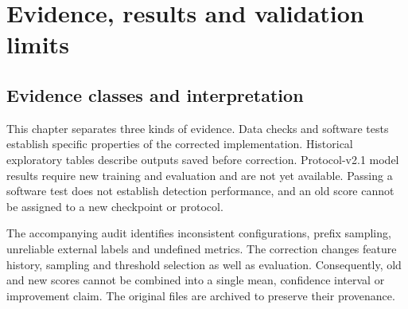 \documentclass[12pt,a4paper,oneside,openany]{extbook}
\begin{document}

\chapter{Evidence, results and validation limits}\label{chap:results}
\section{Evidence classes and interpretation}
This chapter separates three kinds of evidence. Data checks and software tests establish specific properties of the corrected implementation. Historical exploratory tables describe outputs saved before correction. Protocol-v2.1 model results require new training and evaluation and are not yet available. Passing a software test does not establish detection performance, and an old score cannot be assigned to a new checkpoint or protocol.

The accompanying audit identifies inconsistent configurations, prefix sampling, unreliable external labels and undefined metrics. The correction changes feature history, sampling and threshold selection as well as evaluation. Consequently, old and new scores cannot be combined into a single mean, confidence interval or improvement claim. The original files are archived to preserve their provenance.

\end{document}
